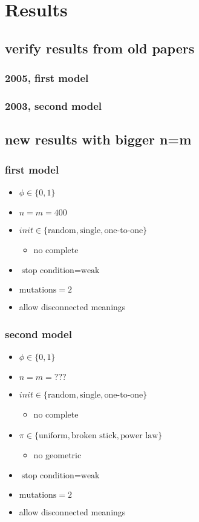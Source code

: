 \chapter{Results}

\section{verify results from old papers}
\subsection{2005, first model}
\subsection{2003, second model}
\section{new results with bigger n=m}
\subsection{first model}
\begin{itemize}
\item $\phi \in \{0,1\}$
\item $n=m=400$
\item $init \in \{\text{random},\text{single},\text{one-to-one}\}$
  \begin{itemize}
  \item no complete
  \end{itemize}
\item $\text{stop condition} = \text{weak}$
\item $\text{mutations} = 2$
\item allow disconnected meanings
\end{itemize}
\subsection{second model}
\begin{itemize}
\item $\phi \in \{0,1\}$
\item $n=m=???$
\item $init \in \{\text{random},\text{single},\text{one-to-one}\}$
  \begin{itemize}
  \item no complete
  \end{itemize}
\item $\pi \in \{\text{uniform},\text{broken stick},\text{power law}\}$
  \begin{itemize}
  \item no geometric
  \end{itemize}
\item $\text{stop condition} = \text{weak}$
\item $\text{mutations} = 2$
\item allow disconnected meanings
\end{itemize}

